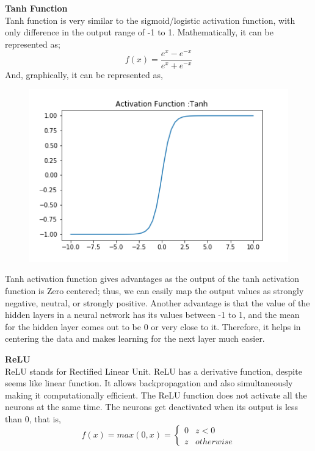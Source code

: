 \textbf{Tanh Function}\\
Tanh function is very similar to the sigmoid/logistic activation function, with only difference in the output range of -1 to 1. 
Mathematically, it can be represented as;
\begin{equation}
    f(x) = \frac{e^x - e^{-x}}{e^x + e^{-x}}
\end{equation}
And, graphically, it can be represented as,\\
\begin{figure}[H]
    \centering
    \includegraphics{Figures/Tanh.png}
    \label{fig:my_label}
\end{figure}


Tanh activation function gives advantages as the output of the tanh activation function is Zero centered; thus, we can easily map the output values as strongly negative, neutral, or strongly positive. Another advantage is that the value of the hidden layers in a neural network has its values  between -1 to 1, and the mean for the hidden layer comes out to be 0 or very close to it. Therefore, it helps in centering the data and makes learning for the next layer much easier.

\textbf{ReLU} \\
ReLU stands for Rectified Linear Unit. ReLU has a derivative function, despite seems like linear function. It allows backpropagation and also simultaneously making it computationally efficient. The ReLU function does not activate all the neurons at the same time. The neurons get deactivated when its output is less than 0, that is,
\begin{equation}
    f(x) = max(0,x) = \begin{cases} 
      0 & z < 0 \\
      z & otherwise 
   \end{cases}
\end{equation}

